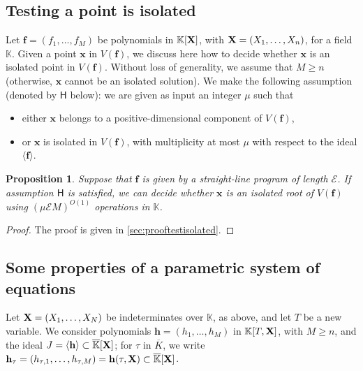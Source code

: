 \documentclass[11pt]{article}
\numberwithin{Property}{section}
\numberwithin{Theorem}{section}
\newtheorem{Proposition}{Proposition}%
\numberwithin{Proposition}{section}
\numberwithin{Lemma}{section}
\numberwithin{Corollary}{section}
\numberwithin{Definition}{section}
\numberwithin{Remark}{section}
\numberwithin{Conjecture}{section}
\numberwithin{Problem}{section}
\numberwithin{Claim}{section}
\theoremstyle{definition}
\numberwithin{Example}{section}
\renewcommand{\ge}{\geqslant}
\def\bar{\overline}
\renewcommand{\ge}{\geqslant} %
\newcommand{\field}{\mathbb{K}} %
\newcommand{\mat}[1]{\mathbf{\MakeUppercase{#1}}} %
\newcommand{\improve}[1]{\textcolor{blue}{#1}} %
\begin{document}
\subsection{Testing a point is isolated}
\label{subsec:isolated}
Let $\mathbf{f}=(f_1,\dots,f_M)$ be polynomials in $\field[\mat{X}]$, with $\mat{X}=(X_1,\dots,X_n)$, for a field $\field$. Given a point $\mathbf{x}$ in $V(\mathbf{f})$, we discuss here how to decide whether $\mathbf{x}$ is an isolated point in $V(\mathbf{f})$. Without loss of generality, we assume that $M\ge n$ (otherwise, $\mathbf{x}$
cannot be an isolated solution). We make the following assumption (denoted by $\mathsf{H}$ below): we are given as input an integer $\mu$ such that
\begin{itemize}
\item either $\mathbf{x}$ belongs to a positive-dimensional component of $V(\mathbf{f})$,
\item or $\mathbf{x}$ is isolated in $V(\mathbf{f})$, with multiplicity at most $\mu$
  with respect to the ideal $\langle \mathbf{f} \rangle$.
\end{itemize}

\begin{Proposition}\label{testisolated} Suppose that $\mathbf{f}$ is given by a straight-line program of length $\mathcal{E}$. If assumption $\mathsf{H}$ is satisfied, we can decide whether $\mathbf{x}$ is an isolated root of $V(\mathbf{f})$ using $(\mu \mathcal{E} M)^{O(1)}$ operations in $\field$.
\end{Proposition}
\begin{proof}
The proof is given in \improve{\cref{sec:prooftestisolated}}. 
\end{proof}
\subsection{Some properties of a parametric system of equations}
Let $\mat{X}=(X_1,\dots,X_N)$ be indeterminates over $\field$, as above, and let $T$ be a new variable. We consider polynomials $\mathbf{h}=(h_1,\dots,h_M)$ in $\field[T,\mat{X}]$, with $M \ge n$, and the ideal $J=\langle \mathbf{h} \rangle \subset \bar{\field}[\mat{X}]$; for $\tau$ in $\bar{K}$, we write $\mathbf{h}_\tau=(h_{\tau,1},\dots,h_{\tau,M})=\mathbf{h}(\tau,\mat{X})\subset \bar{\field}[\mat{X}]$. 
\end{document}
